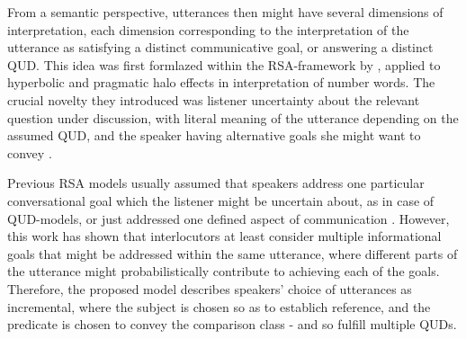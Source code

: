 From a semantic perspective, utterances then might have several dimensions of interpretation, each dimension corresponding to the interpretation of the utterance as satisfying a distinct communicative goal, or answering a distinct QUD. This idea was first formlazed within the RSA-framework by \textcite{kao2014nonliteral}, applied to hyperbolic and pragmatic halo effects in interpretation of number words. The crucial novelty they introduced was listener uncertainty about the relevant question under discussion, with literal meaning of the utterance depending on the assumed QUD, and the speaker having alternative goals she might want to convey \parencite{kao2014nonliteral}. 

Previous RSA models usually assumed that speakers address one particular conversational goal which the listener might be uncertain about, as in case of QUD-models, or just addressed one defined aspect of communication \parencite[see][for an excellent overview]{problang}. However, this work has shown that interlocutors at least consider multiple informational goals that might be addressed within the same utterance, where different parts of the utterance might probabilistically contribute to achieving each of the goals. Therefore, the proposed model describes speakers' choice of utterances as incremental, where the subject is chosen so as to establich reference, and the predicate is chosen to convey the comparison class - and so fulfill multiple QUDs. 
